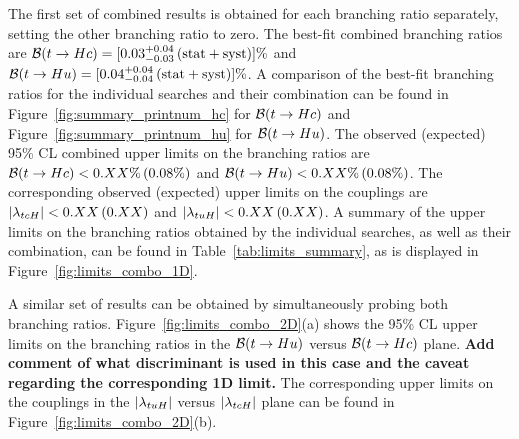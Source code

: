 
The first set of combined results is obtained for each branching ratio separately, setting the other branching ratio to zero.
The best-fit combined branching ratios are $\mathcal{B}(t\to Hc)=[0.03 ^{+0.04}_{-0.03}\,(\mathrm{stat+syst})]\%$ and 
$\mathcal{B}(t\to Hu)=[0.04 ^{+0.04}_{-0.04}\,(\mathrm{stat+syst})]\%$.  
A comparison of the best-fit branching ratios for the individual searches and their combination can be found in Figure~\ref{fig:summary_printnum_hc} 
for $\mathcal{B}(t\to Hc)$ and Figure~\ref{fig:summary_printnum_hu} for $\mathcal{B}(t\to Hu)$.
The observed (expected) 95\% CL combined upper limits on the branching ratios are 
$\mathcal{B}(t\to Hc)<0.XX\%\,(0.08\%)$ and $\mathcal{B}(t\to Hu)<0.XX\%\,(0.08\%)$. 
The corresponding observed (expected) upper limits on the couplings are $|\lambda_{tcH}|<0.XX\,(0.XX)$ and $|\lambda_{tuH}|<0.XX\,(0.XX)$.
A summary of the upper limits on the branching ratios obtained by the individual searches, as well as their combination, 
can be found in Table~\ref{tab:limits_summary}, as is displayed in Figure~\ref{fig:limits_combo_1D}. 

A similar set of results can be obtained by  simultaneously probing both branching ratios. 
Figure~\ref{fig:limits_combo_2D}(a) shows the 95\% CL upper limits on the branching ratios in the $\mathcal{B}(t\to Hu)$ versus $\mathcal{B}(t\to Hc)$ plane. 
\textbf{Add comment of what discriminant is used in this case and the caveat regarding the corresponding 1D limit.}
The corresponding upper limits on the couplings in the $|\lambda_{tuH}|$ versus $|\lambda_{tcH}|$ plane can be found in Figure~\ref{fig:limits_combo_2D}(b).


